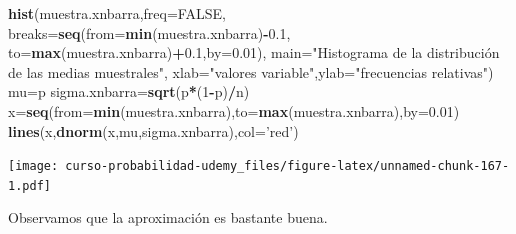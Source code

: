 \documentclass[]{book}
\newenvironment{Shaded}{\begin{snugshade}}{\end{snugshade}}
\newcommand{\DataTypeTok}[1]{\textcolor[rgb]{0.13,0.29,0.53}{#1}}
\newcommand{\DecValTok}[1]{\textcolor[rgb]{0.00,0.00,0.81}{#1}}
\newcommand{\FloatTok}[1]{\textcolor[rgb]{0.00,0.00,0.81}{#1}}
\newcommand{\KeywordTok}[1]{\textcolor[rgb]{0.13,0.29,0.53}{\textbf{#1}}}
\newcommand{\NormalTok}[1]{#1}
\newcommand{\OperatorTok}[1]{\textcolor[rgb]{0.81,0.36,0.00}{\textbf{#1}}}
\newcommand{\OtherTok}[1]{\textcolor[rgb]{0.56,0.35,0.01}{#1}}
\newcommand{\StringTok}[1]{\textcolor[rgb]{0.31,0.60,0.02}{#1}}
\begin{document}
\begin{Shaded}
\begin{Highlighting}[]
\KeywordTok{hist}\NormalTok{(muestra.xnbarra,}\DataTypeTok{freq=}\OtherTok{FALSE}\NormalTok{,}
     \DataTypeTok{breaks=}\KeywordTok{seq}\NormalTok{(}\DataTypeTok{from=}\KeywordTok{min}\NormalTok{(muestra.xnbarra)}\OperatorTok{-}\FloatTok{0.1}\NormalTok{,}
                \DataTypeTok{to=}\KeywordTok{max}\NormalTok{(muestra.xnbarra)}\OperatorTok{+}\FloatTok{0.1}\NormalTok{,}\DataTypeTok{by=}\FloatTok{0.01}\NormalTok{),}
     \DataTypeTok{main=}\StringTok{"Histograma de la distribución de las medias muestrales"}\NormalTok{,}
     \DataTypeTok{xlab=}\StringTok{"valores variable"}\NormalTok{,}\DataTypeTok{ylab=}\StringTok{"frecuencias relativas"}\NormalTok{)}
\NormalTok{mu=p}
\NormalTok{sigma.xnbarra=}\KeywordTok{sqrt}\NormalTok{(p}\OperatorTok{*}\NormalTok{(}\DecValTok{1}\OperatorTok{-}\NormalTok{p)}\OperatorTok{/}\NormalTok{n)}
\NormalTok{x=}\KeywordTok{seq}\NormalTok{(}\DataTypeTok{from=}\KeywordTok{min}\NormalTok{(muestra.xnbarra),}\DataTypeTok{to=}\KeywordTok{max}\NormalTok{(muestra.xnbarra),}\DataTypeTok{by=}\FloatTok{0.01}\NormalTok{)}
\KeywordTok{lines}\NormalTok{(x,}\KeywordTok{dnorm}\NormalTok{(x,mu,sigma.xnbarra),}\DataTypeTok{col=}\StringTok{'red'}\NormalTok{)}
\end{Highlighting}
\end{Shaded}

\texttt{[image: curso-probabilidad-udemy\_files/figure-latex/unnamed-chunk-167-1.pdf]}

Observamos que la aproximación es bastante buena.


\end{document}
